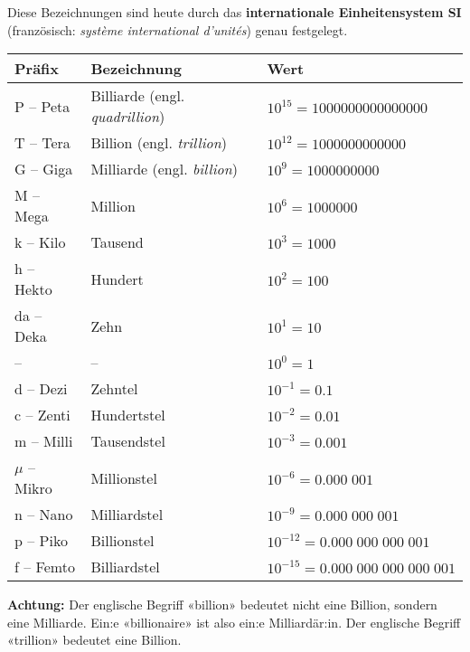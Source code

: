 Diese Bezeichnungen sind heute durch das \textbf{internationale Einheitensystem SI} (französisch: \textit{système international d’unités}) genau festgelegt.
\begin{center}
  \renewcommand{\arraystretch}{1.1}
  \begin{tabularx}{0.9\textwidth}{lXX}
    \textbf{Präfix} & \textbf{Bezeichnung} & \textbf{Wert} \\
  \toprule
    P -- Peta & Billiarde (engl. \textit{quadrillion}) & $10^{15} = \num{1000000000000000}$ \\
  \midrule
    T -- Tera & Billion (engl. \textit{trillion}) & $10^{12} = \num{1000000000000}$ \\
  \midrule
    G -- Giga & Milliarde (engl. \textit{billion}) & $10^{9} = \num{1000000000}$ \\
  \midrule
    M -- Mega & Million & $10^{6} = \num{1000000}$ \\
  \midrule
    k -- Kilo & Tausend & $10^{3} = \num{1000}$ \\
  \midrule
    h -- Hekto & Hundert & $10^{2} = 100$ \\
  \midrule
    da -- Deka & Zehn & $10^{1} = 10$ \\
  \midrule
    -- & -- & $10^{0} = 1$ \\
  \midrule
    d -- Dezi & Zehntel & $10^{-1} = 0.1$ \\
  \midrule
    c -- Zenti & Hundertstel & $10^{-2} = 0.01$ \\
  \midrule
    m -- Milli & Tausendstel & $10^{-3} = 0.001$ \\
  \midrule
    $\mu$ -- Mikro & Millionstel & $10^{-6} = 0.000\;001$ \\
  \midrule
    n -- Nano & Milliardstel & $10^{-9} = 0.000\;000\;001$ \\
  \midrule
    p -- Piko & Billionstel & $10^{-12} = 0.000\;000\;000\;001$ \\
  \midrule
    f -- Femto & Billiardstel & $10^{-15} = 0.000\;000\;000\;000\;001$ \\
  \bottomrule
  \end{tabularx}
\end{center}
\begin{note}
\textbf{Achtung:} Der englische Begriff «billion» bedeutet nicht eine Billion, sondern eine Milliarde. Ein:e «billionaire» ist also ein:e Milliardär:in. Der englische Begriff «trillion» bedeutet eine Billion.
\end{note}
